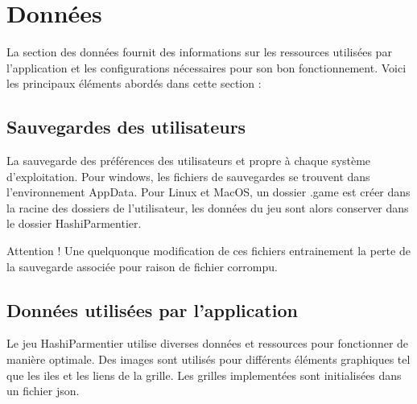 \section{Données}

La section des données fournit des informations sur les ressources utilisées par l'application et les configurations nécessaires pour son bon fonctionnement. Voici les principaux éléments abordés dans cette section :

\subsection{Sauvegardes des utilisateurs}

La sauvegarde des préférences des utilisateurs et propre à chaque système d'exploitation. Pour windows, les fichiers de sauvegardes se trouvent dans l'environnement AppData. Pour Linux et MacOS, un dossier .game est créer dans la racine des dossiers de l'utilisateur, les données du jeu sont alors conserver dans le dossier HashiParmentier.

Attention ! Une quelquonque modification de ces fichiers entrainement la perte de la sauvegarde associée pour raison de fichier corrompu. 

\subsection{Données utilisées par l'application}

Le jeu HashiParmentier utilise diverses données et ressources pour fonctionner de manière optimale. Des images sont utilisés pour différents éléments graphiques tel que les iles et les liens de la grille. Les grilles implementées sont initialisées dans un fichier json.